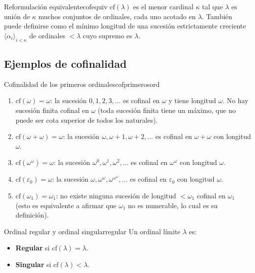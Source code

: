 \begin{observacion}{Reformulación equivalente}{cofequiv}
$\mathrm{cf}(\lambda)$ es el menor cardinal $\kappa$ tal que $\lambda$ es unión de $\kappa$ muchos conjuntos de ordinales, cada uno acotado en $\lambda$. También puede definirse como el mínimo longitud de una sucesión estrictamente creciente $\langle \alpha_i \rangle_{i < \kappa}$ de ordinales $< \lambda$ cuyo supremo es $\lambda$.
\end{observacion}

\subsection{Ejemplos de cofinalidad}

\begin{ejemplo}{Cofinalidad de los primeros ordinales}{cofprimerosord}
\begin{enumerate}[leftmargin=2em, label=(\alph*)]
  \item $\mathrm{cf}(\omega) = \omega$: la sucesión $0, 1, 2, 3, \ldots$ es cofinal en $\omega$ y tiene longitud $\omega$. No hay sucesión finita cofinal en $\omega$ (toda sucesión finita tiene un máximo, que no puede ser cota superior de todos los naturales).

  \item $\mathrm{cf}(\omega + \omega) = \omega$: la sucesión $\omega, \omega+1, \omega+2, \ldots$ es cofinal en $\omega+\omega$ con longitud $\omega$.

  \item $\mathrm{cf}(\omega^\omega) = \omega$: la sucesión $\omega^0, \omega^1, \omega^2, \ldots$ es cofinal en $\omega^\omega$ con longitud $\omega$.

  \item $\mathrm{cf}(\varepsilon_0) = \omega$: la sucesión $\omega, \omega^\omega, \omega^{\omega^\omega}, \ldots$ es cofinal en $\varepsilon_0$ con longitud $\omega$.

  \item $\mathrm{cf}(\omega_1) = \omega_1$: no existe ninguna sucesión de longitud $< \omega_1$ cofinal en $\omega_1$ (esto es equivalente a afirmar que $\omega_1$ no es numerable, lo cual es su definición).
\end{enumerate}
\end{ejemplo}

\begin{definicion}{Ordinal regular y ordinal singular}{regular}
Un ordinal límite $\lambda$ es:
\begin{itemize}[leftmargin=2em]
  \item \textbf{Regular} si $\mathrm{cf}(\lambda) = \lambda$.
  \item \textbf{Singular} si $\mathrm{cf}(\lambda) < \lambda$.
\end{itemize}
\end{definicion}

